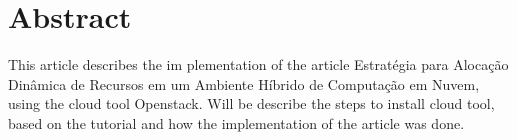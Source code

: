 \chapter[Abstract]{Abstract}\label{cap1}

This article describes the im	plementation of the article Estratégia para Alocação Dinâmica de Recursos em um
  Ambiente Híbrido de Computação em Nuvem, using the cloud tool Openstack. Will be describe the steps to install
  cloud tool, based on the tutorial \cite{ref2} and how the implementation of the article was done.
